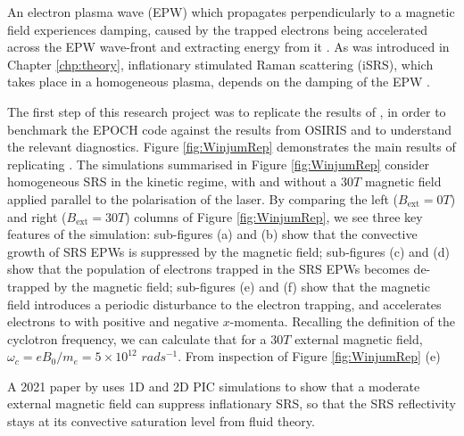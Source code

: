 An electron plasma wave (\acrshort{EPW}) which propagates perpendicularly to a magnetic field experiences damping, caused by the trapped electrons being accelerated across the EPW wave-front and extracting energy from it \citep{Dawson1983}. As was introduced in Chapter \ref{chp:theory}, inflationary stimulated Raman scattering (\acrshort{iSRS}), which takes place in a homogeneous plasma, depends on the damping of the EPW .

The first step of this research project was to replicate the results of \citet{Winjum2018}, in order to benchmark the EPOCH code against the results from OSIRIS and to understand the relevant diagnostics. Figure \ref{fig:WinjumRep} demonstrates the main results of replicating \citet{Winjum2018}. The simulations summarised in Figure \ref{fig:WinjumRep} consider homogeneous SRS in the kinetic regime, with and without a $30\si{T}$ magnetic field applied parallel to the polarisation of the laser. By comparing the left ($B_{\text{ext}}=0\si{T}$) and right ($B_{\text{ext}}=30\si{T}$) columns of Figure \ref{fig:WinjumRep}, we see three key features of the simulation: sub-figures (a) and (b) show that the convective growth of SRS EPWs is suppressed by the magnetic field; sub-figures (c) and (d) show that the population of electrons trapped in the SRS EPWs becomes de-trapped by the magnetic field; sub-figures (e) and (f) show that the magnetic field introduces a periodic disturbance to the electron trapping, and accelerates electrons to with positive and negative $x$-momenta. Recalling the definition of the cyclotron frequency, we can calculate that for a $30\si{T}$ external magnetic field, $\omega_c = eB_0/m_e = 5 \times 10^{12}$ $\si{rad}\si{s}^{-1}$. From inspection of Figure \ref{fig:WinjumRep} (e)

A 2021 paper by \citet{Zhou2021} uses 1D and 2D \acrshort{PIC} simulations to show that a moderate external magnetic field can suppress inflationary SRS, so that the SRS reflectivity stays at its convective saturation level from fluid theory. 



